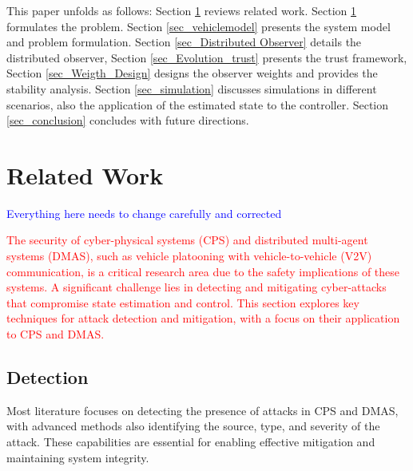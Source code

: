 \documentclass[letterpaper, 10pt, conference]{ieeeconf}  %
\begin{document}
This paper unfolds as follows: Section \ref{sec_related_work} reviews related work. Section \ref{sec_related_work} formulates the problem. Section \ref{sec_vehiclemodel} presents the system model and problem formulation. Section \ref{sec_Distributed Observer} details the distributed observer, Section \ref{sec_Evolution_trust} presents the trust framework, Section \ref{sec_Weigth_Design} designs the observer weights and provides the stability analysis. Section \ref{sec_simulation} discusses simulations in different scenarios, also the application of the estimated state to the controller. Section \ref{sec_conclusion} concludes with future directions.

\section{Related Work}\label{sec_related_work}
\textcolor{blue}{Everything here needs to change carefully and corrected}

\textcolor{red}{The security of cyber-physical systems (CPS) and distributed multi-agent systems (DMAS), such as vehicle platooning with vehicle-to-vehicle (V2V) communication, is a critical research area due to the safety implications of these systems. A significant challenge lies in detecting and mitigating cyber-attacks that compromise state estimation and control. This section explores key techniques for attack detection and mitigation, with a focus on their application to CPS and DMAS.
}

\subsection*{Detection}
Most literature focuses on detecting the presence of attacks in CPS and DMAS, with advanced methods also identifying the source, type, and severity of the attack. These capabilities are essential for enabling effective mitigation and maintaining system integrity.
\end{document}
